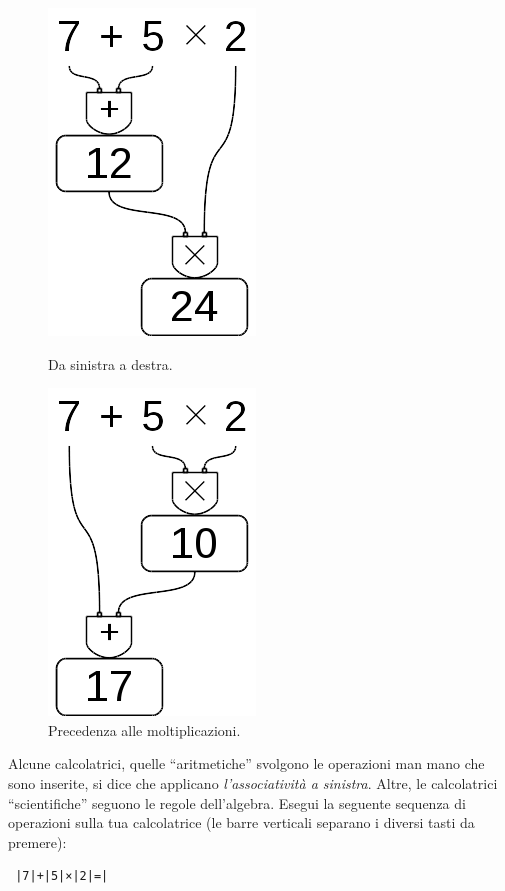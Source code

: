 \begin{inaccessibleblock}[]
\begin{figure}[h]
 \centering
 \begin{minipage}[t]{.40\textwidth}
  \centering\includegraphics[scale=0.35]{img/op_prec1.png}
  \caption{Da sinistra a destra.}\label{fig:op_prec1}
 \end{minipage}\hfil
 \begin{minipage}[t]{.50\textwidth}
  \centering\includegraphics[scale=0.35]{img/op_prec2.png}
  \caption{Precedenza alle moltiplicazioni.}\label{fig:op_prec2}
 \end{minipage}
\end{figure}
\end{inaccessibleblock}
\osservazione Alcune calcolatrici, quelle ``aritmetiche'' svolgono le 
operazioni man mano che sono inserite, si dice che applicano 
\emph{l'associatività a sinistra}. Altre, le calcolatrici ``scientifiche'' 
seguono le regole dell'algebra. Esegui la seguente sequenza di operazioni 
sulla tua calcolatrice 
(le barre verticali separano i diversi tasti da premere):
\begin{verbatim}
 |7|+|5|×|2|=|
\end{verbatim} 

